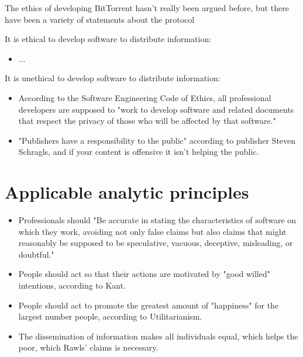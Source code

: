\documentclass[11pt]{article}
\begin{document}
The ethics of developing BitTorrent hasn't really been argued before, but there have been a variety of statements about the protocol

It is ethical to develop software to distribute information:
\begin{itemize}
\item ...
\end{itemize}

It is unethical to develop software to distribute information:
\begin{itemize}
\item According to the Software Engineering Code of Ethics, all professional developers are supposed to "work to develop software and related documents that respect the privacy of those who will be affected by that software." \cite{secode}
\item "Publishers have a responsibility to the public" according to publisher Steven Schragls, and if your content is offensive it isn't helping the public. \cite[46]{hawker}
\end{itemize}

\section{Applicable analytic principles}

\begin{itemize}
\item Professionals should "Be accurate in stating the characteristics of software on which they work, avoiding not only false claims but also claims that might reasonably be supposed to be speculative, vacuous, deceptive, misleading, or doubtful." \cite{secode}
\item People should act so that their actions are motivated by "good willed" intentions, according to Kant. \cite{kant}
\item People should act to promote the greatest amount of "happiness" for the largest number people, according to Utilitarianism. \cite{util}
\item The dissemination of information makes all individuals equal, which helps the poor, which Rawls' claims is necessary. \cite{rawls}
\end{itemize}
\end{document}
